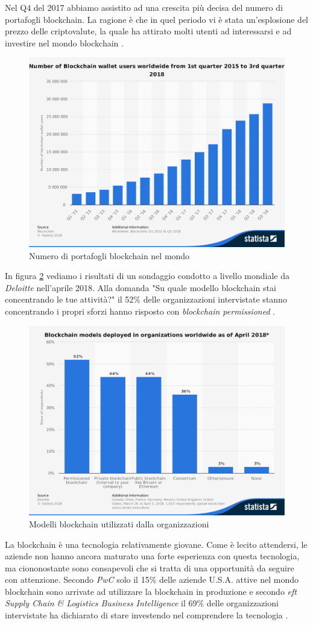 Nel Q4 del 2017 abbiamo assistito ad una crescita più decisa del numero di portafogli blockchain.
La ragione è che in quel periodo vi è stata un'esplosione del prezzo delle criptovalute, la quale
ha attirato molti utenti ad interessarsi e ad investire nel mondo blockchain \cite{bitcoin-price-boom}.

\begin{figure}[H]
	\centering
	\includegraphics[width=.5\linewidth]{images/chap_intro/number-of-blockchain-wallet.pdf}
	\caption{Numero di portafogli blockchain nel mondo \cite{number-of-blockchain-wallet}}
	\label{fig:number-of-blockchain-wallet}
\end{figure}

In figura \ref{fig:model-focus-for-blockchain}
vediamo i risultati di un sondaggio condotto a livello mondiale da \textit{Deloitte} nell'aprile 2018.
Alla domanda "Su quale modello blockchain stai concentrando le tue attività?"
il 52\% delle organizzazioni intervistate stanno concentrando i propri sforzi hanno risposto con
\textit{blockchain permissioned} \cite{model-focus-for-blockchain}.
\begin{figure}[H]
	\centering
	\includegraphics[width=.5\linewidth]{images/chap_intro/model-focus-for-blockchain.pdf}
	\caption{Modelli blockchain utilizzati dalla organizzazioni \cite{model-focus-for-blockchain}}
	\label{fig:model-focus-for-blockchain}
\end{figure}

La blockchain è una tecnologia relativamente giovane. Come è lecito attendersi, le aziende
non hanno ancora maturato una forte esperienza con questa tecnologia, ma ciononostante
sono consapevoli che si tratta
di una opportunità da seguire con attenzione.
Secondo \textit{PwC} solo il 15\% delle aziende U.S.A.
attive nel mondo blockchain sono arrivate ad utilizzare
la blockchain in produzione \cite{stages-of-blockchain-incorporation} e secondo
\textit{eft Supply Chain \& Logistics Business Intelligence}
il 69\% delle organizzazioni intervistate ha dichiarato di stare investendo
nel comprendere la tecnologia \cite{top-spending-in-supply-chain-industry}.


